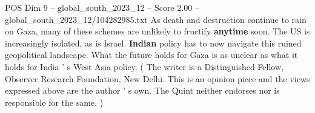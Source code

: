 \begin{textsample}{POS Dim 9 – global\_south\_2023\_12 – Score 2.00 – global\_south\_2023\_12/104282985.txt}
As death and destruction continue to rain on Gaza, many of these schemes are unlikely to fructify \textbf{anytime} soon.
The US is increasingly isolated, as is Israel. \textbf{Indian} policy has to now navigate this ruined geopolitical landscape.
What the future holds for Gaza is as unclear as what it holds for India ' s West Asia policy. ( The writer is a Distinguished Fellow, Observer Research Foundation, New Delhi.
This is an opinion piece and the views expressed above are the author ' s own.
The Quint neither endorses nor is responsible for the same. )

\end{textsample}
